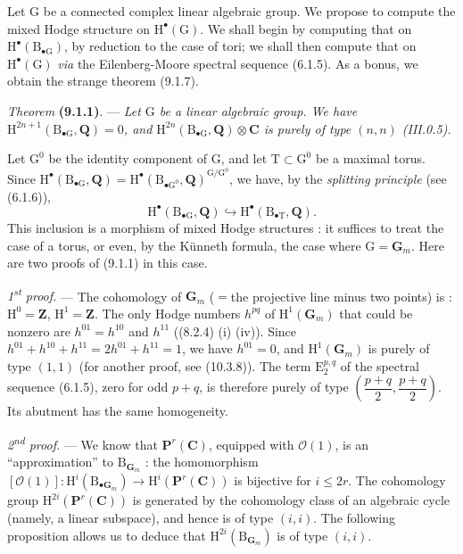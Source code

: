 \documentclass[11pt,leqno]{article}
\begin{document}
Let \(\mathrm{G}\) be a connected complex linear algebraic group. We propose to compute the mixed Hodge structure on \(\mathrm{H}^{\bullet}(\mathrm{G})\). We shall begin by computing that on \(\mathrm{H}^{\bullet}(\mathrm{B}_{\bullet\mathrm{G}})\), by reduction to the case of tori; we shall then compute that on \(\mathrm{H}^{\bullet}(\mathrm{G})\) \textit{via} the Eilenberg-Moore spectral sequence (6.1.5). As a bonus, we obtain the strange theorem (9.1.7).

\textit{Theorem} \textbf{(9.1.1)}. — \textit{Let \(\mathrm{G}\) be a linear algebraic group. We have \(\mathrm{H}^{2n+1}(\mathrm{B}_{\bullet\mathrm{G}},\mathbf{Q})=0\), and \(\mathrm{H}^{2n}(\mathrm{B}_{\bullet\mathrm{G}},\mathbf{Q})\otimes\mathbf{C}\) is purely of type \((n,n)\) \textup{(III.0.5)}.}

Let \(\mathrm{G}^{0}\) be the identity component of \(\mathrm{G}\), and let \(\mathrm{T}\subset\mathrm{G}^{0}\) be a maximal torus. Since \(\mathrm{H}^{\bullet}(\mathrm{B}_{\bullet\mathrm{G}},\mathbf{Q})=\mathrm{H}^{\bullet}(\mathrm{B}_{\bullet\mathrm{G}^{0}},\mathbf{Q})^{\mathrm{G}/\mathrm{G}^{0}}\), we have, by the \textit{splitting principle} (see (6.1.6)),
\[
\mathrm{H}^{\bullet}(\mathrm{B}_{\bullet\mathrm{G}},\mathbf{Q})
\hookrightarrow
\mathrm{H}^{\bullet}(\mathrm{B}_{\bullet\mathrm{T}},\mathbf{Q}).
\]
This inclusion is a morphism of mixed Hodge structures : it suffices to treat the case of a torus, or even, by the Künneth formula, the case where \(\mathrm{G}=\mathbf{G}_{m}\). Here are two proofs of (9.1.1) in this case.

\textit{1\textsuperscript{st} proof.} — The cohomology of \(\mathbf{G}_{m}\) (\(=\)the projective line minus two points) is : \(\mathrm{H}^{0}=\mathbf{Z}\), \(\mathrm{H}^{1}=\mathbf{Z}\). The only Hodge numbers \(h^{pq}\) of \(\mathrm{H}^{1}(\mathbf{G}_{m})\) that could be nonzero are \(h^{01}=h^{10}\) and \(h^{11}\) ((8.2.4) (i) (iv)). Since \(h^{01}+h^{10}+h^{11}=2h^{01}+h^{11}=1\), we have \(h^{01}=0\), and \(\mathrm{H}^{1}(\mathbf{G}_{m})\) is purely of type \((1,1)\) (for another proof, see (10.3.8)). The term \(\mathrm{E}_{2}^{p,q}\) of the spectral sequence (6.1.5), zero for odd \(p+q\), is therefore purely of type \(\left(\dfrac{p+q}{2},\dfrac{p+q}{2}\right)\). Its abutment has the same homogeneity.

\textit{2\textsuperscript{nd} proof.} — We know that \(\mathbf{P}^{r}(\mathbf{C})\), equipped with \(\mathscr{O}(1)\), is an “approximation” to \(\mathrm{B}_{\mathbf{G}_{m}}\) : the homomorphism \([\mathscr{O}(1)]:\mathrm{H}^{i}(\mathrm{B}_{\bullet\mathbf{G}_{m}})\to\mathrm{H}^{i}(\mathbf{P}^{r}(\mathbf{C}))\) is bijective for \(i\leq2r\). The cohomology group \(\mathrm{H}^{2i}(\mathbf{P}^{r}(\mathbf{C}))\) is generated by the cohomology class of an algebraic cycle (namely, a linear subspace), and hence is of type \((i,i)\). The following proposition allows us to deduce that \(\mathrm{H}^{2i}(\mathrm{B}_{\mathbf{G}_{m}})\) is of type \((i,i)\).
\end{document}
